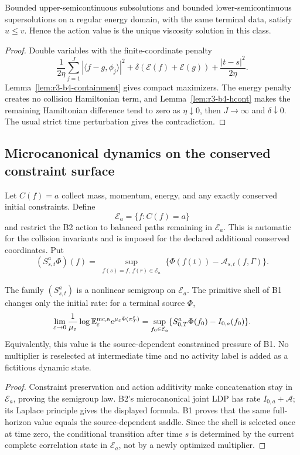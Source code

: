 \begin{theorem}
\label{thm:r3-b4-comparison}
Bounded upper-semicontinuous subsolutions and bounded lower-semicontinuous
supersolutions on a regular energy domain, with the same terminal data, satisfy
\(u\le v\).  Hence the action value is the unique viscosity solution in this
class.
\end{theorem}

\begin{proof}
Double variables with the finite-coordinate penalty
\[
 \frac1{2\eta}\sum_{j=1}^J
 |\langle f-g,\phi_j\rangle|^2
 +\delta(\mathcal E(f)+\mathcal E(g))
 +\frac{|t-s|^2}{2\eta}.
\]
Lemma~\ref{lem:r3-b4-containment} gives compact maximizers.  The energy
penalty creates no collision Hamiltonian term, and
Lemma~\ref{lem:r3-b4-hcont} makes the remaining Hamiltonian difference tend to
zero as \(\eta\downarrow0\), then \(J\to\infty\) and
\(\delta\downarrow0\).  The usual strict time perturbation gives the
contradiction.
\end{proof}

\subsection{Microcanonical dynamics on the conserved constraint surface}

Let \(C(f)=a\) collect mass, momentum, energy, and any exactly conserved
initial constraints.  Define
\[
 \mathcal E_a=\{f:C(f)=a\}
\]
and restrict the B2 action to balanced paths remaining in \(\mathcal E_a\).
This is automatic for the collision invariants and is imposed for the declared
additional conserved coordinates.  Put
\[
 (S_{s,t}^a\Phi)(f)
 =\sup_{\substack{f(s)=f,\ f(r)\in\mathcal E_a}}
 \{\Phi(f(t))-\mathcal A_{s,t}(f,\Gamma)\}.
\]

\begin{theorem}
\label{thm:r3-b4-micro}
The family \((S_{s,t}^a)\) is a nonlinear semigroup on
\(\mathcal E_a\).  The primitive shell of B1 changes only the initial rate:
for a terminal source \(\Phi\),
\[
 \lim_{\varepsilon\to0}
 \frac1{\mu_\varepsilon}
 \log\mathbb E^{\rm mc,a}_\varepsilon
 e^{\mu_\varepsilon\Phi(\pi_T^\varepsilon)}
 =\sup_{f_0\in\mathcal E_a}
 \{S_{0,T}^a\Phi(f_0)-I_{0,a}(f_0)\}.
\]
Equivalently, this value is the source-dependent constrained pressure of B1.
No multiplier is reselected at intermediate time and no activity label is
added as a fictitious dynamic state.
\end{theorem}

\begin{proof}
Constraint preservation and action additivity make concatenation stay in
\(\mathcal E_a\), proving the semigroup law.  B2's microcanonical joint LDP
has rate \(I_{0,a}+\mathcal A\); its Laplace principle gives the displayed
formula.  B1 proves that the same full-horizon value equals the
source-dependent saddle.  Since the shell is selected once at time zero, the
conditional transition after time \(s\) is determined by the current complete
correlation state in \(\mathcal E_a\), not by a newly optimized multiplier.
\end{proof}
